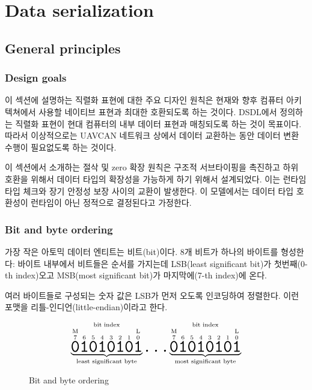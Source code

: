 \section{Data serialization}\label{sec:dsdl_data_serialization}

\newcommand{\hugett}[1]{\texttt{\huge{#1}}}

\subsection{General principles}

\subsubsection{Design goals}

이 섹션에 설명하는 직렬화 표현에 대한 주요 디자인 원칙은 현재와 향후 컴퓨터 아키텍쳐에서 사용할 네이티브 표현과 최대한 호환되도록 하는 것이다.
DSDL에서 정의하는 직렬화 표현이 현대 컴퓨터의 내부 데이터 표현과 매칭되도록 하는 것이 목표이다. 따라서 이상적으로는 UAVCAN 네트워크 상에서 데이터 교환하는 동안 데이터 변환 수행이 필요없도록 하는 것이다.

이 섹션에서 소개하는 절삭 및 zero 확장 원칙은 구조적 서브타이핑을 촉진하고 하위 호환을 위해서 데이터 타입의 확장성을 가능하게 하기 위해서 설계되었다.
이는 런타임 타입 체크와 장기 안정성 보장 사이의 교환이 발생한다.
이 모델에서는 데이터 타입 호환성이 런타임이 아닌 정적으로 결정된다고 가정한다.

\subsubsection{Bit and byte ordering}

가장 작은 아토믹 데이터 엔티트는 비트(bit)이다.
8개 비트가 하나의 바이트를 형성한다:
바이트 내부에서 비트들은 순서를 가지는데 LSB(least significant bit)가 첫번째(0-th index)오고 MSB(most significant bit)가 마지막에(7-th index)에 온다.

여러 바이트들로 구성되는 숫자 값은 LSB가 먼저 오도록 인코딩하여 정렬한다. 
이런 포맷을 리틀-인디언(little-endian)이라고 한다.

\begin{figure}[H]
    $$
    \overset{\text{bit index}}{%
        \underbrace{%
            \overset{\text{M}}{\overset{7}{\hugett{0}}}
            \overset{6}{\hugett{1}}
            \overset{5}{\hugett{0}}
            \overset{4}{\hugett{1}}
            \overset{3}{\hugett{0}}
            \overset{2}{\hugett{1}}
            \overset{1}{\hugett{0}}
            \overset{\text{L}}{\overset{0}{\hugett{1}}}
        }_\text{least significant byte}%
    }
    \hugett{\ldots}
    \overset{\text{bit index}}{%
        \underbrace{%
            \overset{\text{M}}{\overset{7}{\hugett{0}}}
            \overset{6}{\hugett{1}}
            \overset{5}{\hugett{0}}
            \overset{4}{\hugett{1}}
            \overset{3}{\hugett{0}}
            \overset{2}{\hugett{1}}
            \overset{1}{\hugett{0}}
            \overset{\text{L}}{\overset{0}{\hugett{1}}}
        }_\text{most significant byte}%
    }
    $$
    \caption{Bit and byte ordering\label{fig:dsdl_serialization_bit_ordering}}
\end{figure}

